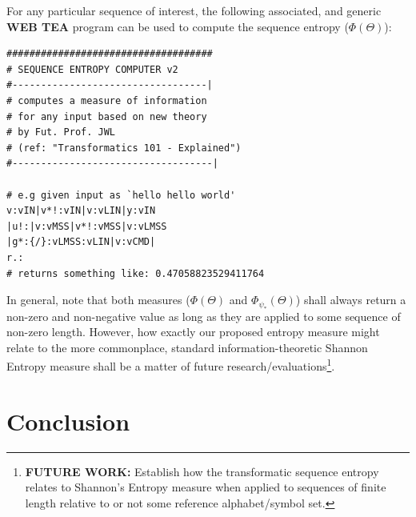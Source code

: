 \documentclass[a4paper, 18pt]{book} %
\begin{document}
For any particular sequence of interest, the following associated, and generic \textbf{WEB TEA} program can be used to compute the sequence entropy ($\Phi(\Theta)$):

\vspace{2em}

  \begin{tcolorbox}[teaterminalstyle, title=TEA Program: Sequence Entropy Computer, breakable]
    \begin{lstlisting}[language=TEA,breaklines=true,label={LSTSEQENTROPY},caption=SEC in TEA]
####################################
# SEQUENCE ENTROPY COMPUTER v2
#----------------------------------|
# computes a measure of information
# for any input based on new theory
# by Fut. Prof. JWL 
# (ref: "Transformatics 101 - Explained")
#-----------------------------------|

# e.g given input as `hello hello world'
v:vIN|v*!:vIN|v:vLIN|y:vIN
|u!:|v:vMSS|v*!:vMSS|v:vLMSS
|g*:{/}:vLMSS:vLIN|v:vCMD|
r.:
# returns something like: 0.47058823529411764
   \end{lstlisting}
  \end{tcolorbox}
  \vspace{2em}


In general, note that both measures ($\Phi(\Theta)$ and $\Phi_{\psi_*}(\Theta)$) shall always return a non-zero and non-negative value as long as they are applied to some sequence of non-zero length. However, how exactly our proposed entropy measure might relate to the more commonplace, standard information-theoretic Shannon Entropy measure shall be a matter of future research/evaluations\footnote{\textbf{FUTURE WORK:} Establish how the transformatic sequence entropy relates to Shannon's Entropy measure when applied to sequences of finite length relative to or not some reference alphabet/symbol set.}.\\


\section{Conclusion}
\end{document}
